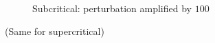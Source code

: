\documentclass[pt12]{beamer}
\newcommand{\uapp}[0]{\uvec{u}_h}
\newcommand{\uvec}[2][3]{\boldsymbol{#2\mkern-#1mu}\mkern#1mu}
\begin{document}
\begin{frame}
\begin{itemize}
\begin{figure}
\begin{subfigure}[b]{0.4\textwidth}
     \end{subfigure}
         \caption*{Subcritical: perturbation amplified by $100$}
        \label{pert_trans_sup}
\end{figure}
\centering
(Same for supercritical)









\end{itemize}

\end{frame}


%
%
%
%
%
%
%
%
\end{document}
